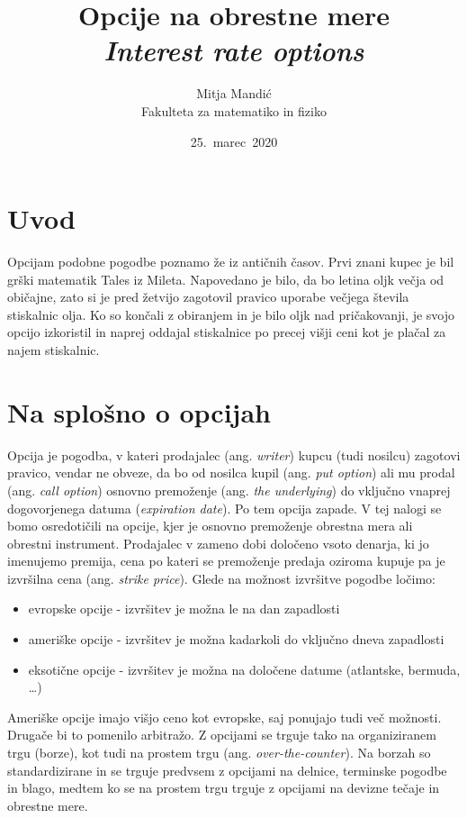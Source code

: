 \documentclass[a4paper]{article}
\title{Opcije na obrestne mere\\
    \textit{Interest rate options}}
\author{Mitja Mandić \\ Fakulteta za matematiko in fiziko}
\date{25.\ marec\ 2020}
\begin{document}
\maketitle

\pagebreak
\tableofcontents
\pagebreak

\section{Uvod}
Opcijam podobne pogodbe poznamo že iz antičnih časov. Prvi znani kupec je bil grški matematik Tales iz Mileta.
Napovedano je bilo, da bo letina oljk večja od običajne, zato si je pred žetvijo zagotovil pravico uporabe večjega
števila stiskalnic olja. Ko so končali z obiranjem in je bilo oljk nad pričakovanji, je svojo opcijo izkoristil in naprej oddajal
stiskalnice po precej višji ceni kot je plačal za najem stiskalnic.

\section{Na splošno o opcijah}

Opcija je pogodba, v kateri prodajalec (ang. \textit{writer}) kupcu (tudi nosilcu) zagotovi pravico, 
vendar ne obveze, da bo od nosilca kupil (ang. \textit{put option})
ali mu prodal (ang. \textit{call option}) osnovno premoženje (ang. \textit{the underlying}) do 
vključno vnaprej dogovorjenega datuma (\textit{expiration date}).
Po tem opcija zapade.  V tej nalogi se bomo osredotičili na opcije, kjer je
osnovno premoženje obrestna mera ali obrestni instrument. Prodajalec v zameno dobi določeno vsoto denarja, ki jo imenujemo premija, 
cena po kateri se premoženje predaja oziroma kupuje pa je izvršilna cena (ang. \textit{strike price}).
Glede na možnost izvršitve pogodbe ločimo:
\begin{itemize}
    \item evropske opcije - izvršitev je možna le na dan zapadlosti
    \item ameriške opcije - izvršitev je možna kadarkoli do vključno dneva zapadlosti
    \item eksotične opcije - izvršitev je možna na določene datume (atlantske, bermuda, \ldots)
\end{itemize}

Ameriške opcije imajo višjo ceno kot evropske, saj ponujajo tudi več možnosti. Drugače bi to pomenilo arbitražo.
Z opcijami se trguje tako na organiziranem trgu (borze), kot tudi na prostem trgu (ang. \textit{over-the-counter}). Na borzah so
standardizirane in se trguje predvsem z opcijami na delnice, terminske pogodbe in blago, medtem ko se na prostem trgu trguje z opcijami
na devizne tečaje in obrestne mere.
\end{document}
